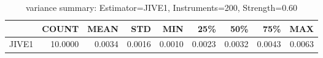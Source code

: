 \begin{table}[ht]
\centering
\caption{variance summary: Estimator=JIVE1, Instruments=200, Strength=0.60}
\begin{tabular}{lrrrrrrrr}
\toprule
 & COUNT & MEAN & STD & MIN & 25\% & 50\% & 75\% & MAX \\
\midrule
JIVE1 & 10.0000 & 0.0034 & 0.0016 & 0.0010 & 0.0023 & 0.0032 & 0.0043 & 0.0063 \\
\bottomrule
\end{tabular}
\end{table}
